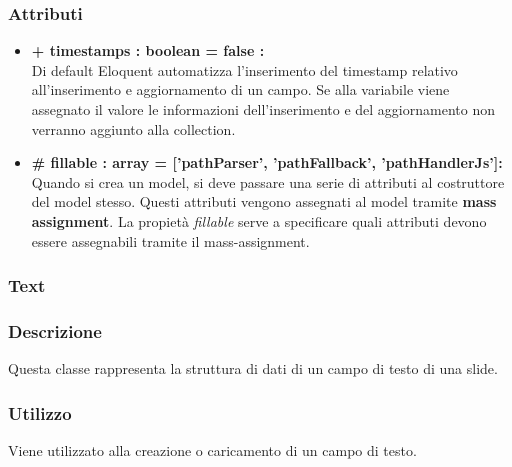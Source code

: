 	\subsubsection*{Attributi}
	\begin{itemize}
		\item \textbf{+ timestamps : boolean = false :}\\
		Di default Eloquent automatizza l'inserimento del timestamp relativo all'inserimento e aggiornamento di un campo. Se alla variabile viene assegnato il valore le informazioni dell'inserimento e del aggiornamento non verranno aggiunto alla collection.
		\item \textbf{\# fillable : array = ['pathParser’, ’pathFallback’, ’pathHandlerJs']:}\\
		Quando si crea un model, si deve passare una serie di attributi al costruttore del model stesso. Questi attributi vengono assegnati al model tramite \textbf{mass assignment}. La propietà \textit{fillable} serve a specificare quali attributi devono essere assegnabili tramite il mass-assignment.
		
	\end{itemize}
	
	
\newpage
\subsubsection{Text}


	\subsubsection*{Descrizione}
	Questa classe rappresenta la struttura di dati di un campo di testo di una slide.
	
	\subsubsection*{Utilizzo}
	Viene utilizzato alla creazione o caricamento di un campo di testo.
	
